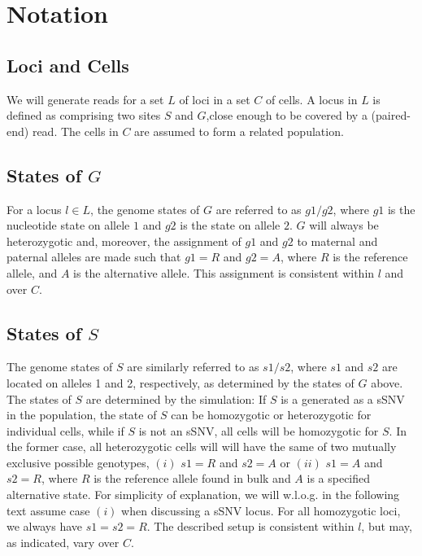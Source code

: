 \documentclass[a4paper,11pt]{article}
\begin{document}

\section{Notation}
\label{sec:notation}

\subsection{Loci and Cells}
\label{sec:loci-cells}

We will generate reads for a set $L$ of loci in a set $C$ of cells. A
locus in $L$ is defined as comprising two sites $S$ and $G$,close
enough to be covered by a (paired-end) read. The cells in $C$ are
assumed to form a related population.


\subsection{States of $G$}
\label{sec:states-g}


For a locus $l\in L$, the genome states of $G$ are referred to as
$g1/g2$, where $g1$ is the nucleotide state on allele $1$ and $g2$ is
the state on allele $2$.  $G$ will always be heterozygotic and,
moreover, the assignment of $g1$ and $g2$ to maternal and paternal
alleles are made such that $g1=R$ and $g2=A$, where $R$ is the
reference allele, and $A$ is the alternative
allele. This assignment is consistent within
$l$ and over $C$.

\subsection{States of $S$}
\label{sec:states-s}

The genome states of $S$ are similarly referred to as $s1/s2$, where
$s1$ and $s2$ are located on alleles 1 and 2, respectively, as
determined by the states of $G$ above. The states of $S$ are
determined by the simulation: If $S$ is a generated as a sSNV in the
population, the state of $S$ can be homozygotic or heterozygotic for
individual cells, while if $S$ is not an sSNV, all cells will be
homozygotic for $S$.  In the former case, all heterozygotic cells will
will have the same of two mutually exclusive possible genotypes, $(i)$
$s1=R$ and $s2=A$ or $(ii)$ $s1=A$ and $s2=R$, where $R$ is the
reference allele found in bulk and $A$ is a specified alternative
state. For simplicity of explanation, we will w.l.o.g. in the
following text assume case $(i)$ when discussing a sSNV locus. For all
homozygotic loci, we always have $s1=s2=R$. The described setup is
consistent within $l$, but may, as indicated, vary over $C$.
\end{document}
